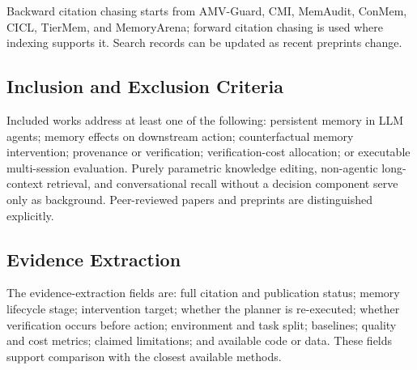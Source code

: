 \documentclass[11pt]{article}
\begin{document}
Backward citation chasing starts from AMV-Guard, CMI, MemAudit, ConMem, CICL, TierMem, and MemoryArena; forward citation chasing is used where indexing supports it. Search records can be updated as recent preprints change.

\subsection{Inclusion and Exclusion Criteria}

Included works address at least one of the following: persistent memory in LLM agents; memory effects on downstream action; counterfactual memory intervention; provenance or verification; verification-cost allocation; or executable multi-session evaluation. Purely parametric knowledge editing, non-agentic long-context retrieval, and conversational recall without a decision component serve only as background. Peer-reviewed papers and preprints are distinguished explicitly.

\subsection{Evidence Extraction}

The evidence-extraction fields are: full citation and publication status; memory lifecycle stage; intervention target; whether the planner is re-executed; whether verification occurs before action; environment and task split; baselines; quality and cost metrics; claimed limitations; and available code or data. These fields support comparison with the closest available methods.



\end{document}
